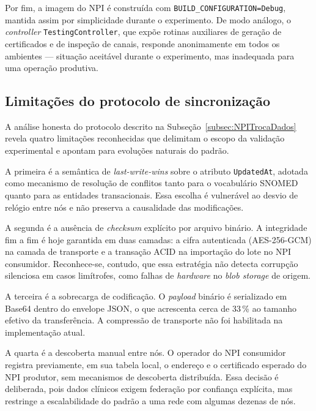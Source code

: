 Por fim, a imagem do NPI é construída com \texttt{BUILD\_CONFIGURATION=Debug}, mantida assim por simplicidade durante o experimento. De modo análogo, o \textit{controller} \texttt{TestingController}, que expõe rotinas auxiliares de geração de certificados e de inspeção de canais, responde anonimamente em todos os ambientes --- situação aceitável durante o experimento, mas inadequada para uma operação produtiva.

\subsection{Limitações do protocolo de sincronização}\label{subsec:limitacoesProtocolo}

A análise honesta do protocolo descrito na Subseção~\ref{subsec:NPITrocaDados} revela quatro limitações reconhecidas que delimitam o escopo da validação experimental e apontam para evoluções naturais do padrão. 

A primeira é a semântica de \textit{last-write-wins} sobre o atributo \texttt{UpdatedAt}, adotada como mecanismo de resolução de conflitos tanto para o vocabulário SNOMED quanto para as entidades transacionais. Essa escolha é vulnerável ao desvio de relógio entre nós e não preserva a causalidade das modificações.

A segunda é a ausência de \textit{checksum} explícito por arquivo binário. A integridade fim a fim é hoje garantida em duas camadas: a cifra autenticada (AES-256-GCM) na camada de transporte e a transação ACID na importação do lote no NPI consumidor. Reconhece-se, contudo, que essa estratégia não detecta corrupção silenciosa em casos limítrofes, como falhas de \textit{hardware} no \textit{blob
storage} de origem.

A terceira é a sobrecarga de codificação. O \textit{payload} binário é serializado em Base64 dentro do envelope JSON, o que acrescenta cerca de 33\,\% ao tamanho efetivo da transferência. A compressão de transporte não foi habilitada na implementação atual.

A quarta é a descoberta manual entre nós. O operador do NPI consumidor registra previamente, em sua tabela local, o endereço e o certificado esperado do NPI produtor, sem mecanismos de descoberta distribuída. Essa decisão é deliberada, pois dados clínicos exigem federação por confiança explícita, mas restringe a escalabilidade do padrão a uma rede com algumas dezenas de nós.


